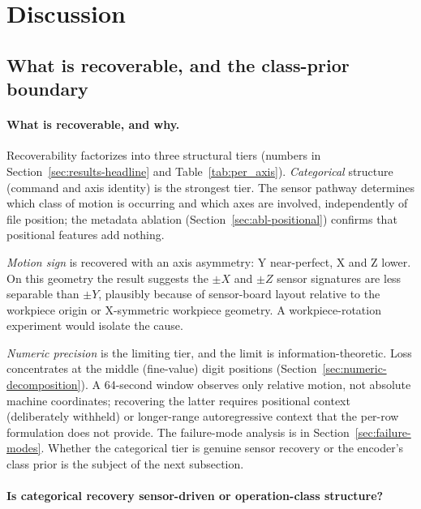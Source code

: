 \documentclass[sensors,article,submit,moreauthors,pdftex]{Definitions/mdpi}
\begin{document}
\section{Discussion}
\label{sec:discussion}

\subsection{What is recoverable, and the class-prior boundary}
\label{sec:disc-deployment}

\paragraph{What is recoverable, and why.}\label{sec:disc-recoverability}\hspace*{0pt plus 1fill}

Recoverability factorizes into three structural tiers (numbers in Section~\ref{sec:results-headline} and Table~\ref{tab:per_axis}). \emph{Categorical} structure (command and axis identity) is the strongest tier. The sensor pathway determines which class of motion is occurring and which axes are involved, independently of file position; the metadata ablation (Section~\ref{sec:abl-positional}) confirms that positional features add nothing.

\emph{Motion sign} is recovered with an axis asymmetry: Y near-perfect, X and Z lower. On this geometry the result suggests the $\pm X$ and $\pm Z$ sensor signatures are less separable than $\pm Y$, plausibly because of sensor-board layout relative to the workpiece origin or X-symmetric workpiece geometry. A workpiece-rotation experiment would isolate the cause.

\emph{Numeric precision} is the limiting tier, and the limit is information-theoretic. Loss concentrates at the middle (fine-value) digit positions (Section~\ref{sec:numeric-decomposition}). A 64-second window observes only relative motion, not absolute machine coordinates; recovering the latter requires positional context (deliberately withheld) or longer-range autoregressive context that the per-row formulation does not provide. The failure-mode analysis is in Section~\ref{sec:failure-modes}. Whether the categorical tier is genuine sensor recovery or the encoder's class prior is the subject of the next subsection.\label{sec:disc-failure-mode}

\paragraph{Is categorical recovery sensor-driven or operation-class structure?}\label{sec:disc-confound}\hspace*{0pt plus 1fill}
\end{document}
